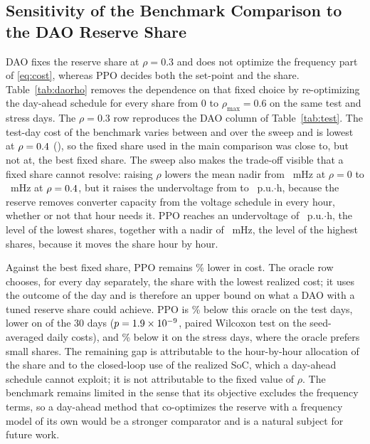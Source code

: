 

\subsection{Sensitivity of the Benchmark Comparison to the DAO Reserve Share}
\label{sec:daorho}

DAO fixes the reserve share at $\rho=0.3$ and does not optimize the
frequency part of \eqref{eq:cost}, whereas PPO decides both the
set-point and the share. Table~\ref{tab:daorho} removes the
dependence on that fixed choice by re-optimizing the day-ahead
schedule for every share from 0 to $\rho_{\max}=0.6$ on the same test
and stress days. The $\rho=0.3$ row reproduces the DAO column of
Table~\ref{tab:test}. The test-day cost of the benchmark varies
between \DaoRhoMinCost{} and \DaoRhoMaxCost{} over the sweep and is
lowest at $\rho=0.4$ (\DaoRhoBestCost), so the fixed share
used in the main comparison was close to, but not at, the best fixed
share. The sweep also makes the trade-off visible that a fixed share
cannot resolve: raising $\rho$ lowers the mean nadir from
\DaoRhoZeroNadir~mHz at $\rho=0$ to \DaoRhoBestNadir~mHz at
$\rho=0.4$, but it raises the undervoltage from
\DaoRhoZeroUv{} to \DaoRhoBestUv~p.u.$\cdot$h, because the reserve
removes converter capacity from the voltage schedule in every hour,
whether or not that hour needs it. PPO reaches an undervoltage of
\TPPOUvPuH~p.u.$\cdot$h, the level of the lowest shares, together with
a nadir of \TPPONadirMeanHz~mHz, the level of the highest shares,
because it moves the share hour by hour.

Against the best fixed share, PPO remains \RedCostDaoRhoBest\% lower in
cost. The oracle row chooses, for every day separately, the share
with the lowest realized cost; it uses the outcome of the day and is
therefore an upper bound on what a DAO with a tuned reserve share
could achieve. PPO is \RedCostDaoOracle\% below this oracle on the test
days, lower on \WinsDaoOracle{} of the 30 days ($p=1.9\times10^{-9}$,
paired Wilcoxon test on the seed-averaged daily costs), and
\RedCostDaoOracleS\% below it on the stress days, where the oracle
prefers small shares. The remaining gap is attributable to the
hour-by-hour allocation of the share and to the closed-loop use of
the realized SoC, which a day-ahead schedule cannot exploit; it
is not attributable to the fixed value of $\rho$. The benchmark
remains limited in the sense that its objective excludes the
frequency terms, so a day-ahead method that co-optimizes the reserve
with a frequency model of its own would be a stronger comparator and
is a natural subject for future work.

